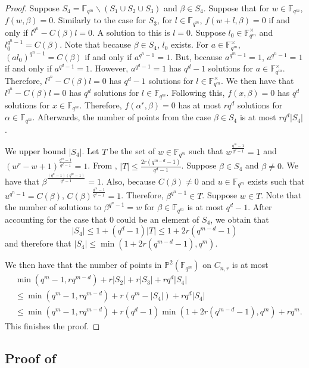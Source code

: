 \documentclass[12pt,letterpaper]{amsart}
\theoremstyle{definition}
\begin{document}
\begin{proof}
Suppose $S_4=\mathbb{F}_{q^m}\backslash (S_1\cup S_2\cup S_3)$ and $\beta\in S_4$. Suppose that for $w\in\mathbb{F}_{q^m}$, $f(w,\beta)=0$. Similarly to the case for $S_3$, for $l\in\mathbb{F}_{q^m}$, $f(w+l,\beta)=0$ if and only if $l^{q^n}-C(\beta)l=0$. A solution to this is $l=0$. Suppose $l_0\in\mathbb{F}_{q^m}^{\times}$ and $l_0^{q^n-1}=C(\beta)$. Note that because $\beta\in S_4$, $l_0$ exists. For $a\in\mathbb{F}_{q^m}^{\times}$, $(al_0)^{q^n-1}=C(\beta)$ if and only if $a^{q^n-1}=1$. But, because $a^{q^m-1}=1$, $a^{q^n-1}=1$ if and only if $a^{q^d-1}=1$. However, $a^{q^d-1}=1$ has $q^d-1$ solutions for $a\in\mathbb{F}_{q^m}^{\times}$. Therefore, $l^{q^n}-C(\beta)l=0$ has $q^d-1$ solutions for $l\in\mathbb{F}_{q^m}^{\times}$. We then have that $l^{q^n}-C(\beta)l=0$ has $q^d$ solutions for $l\in\mathbb{F}_{q^m}$. Following this, $f(x,\beta)=0$ has $q^d$ solutions for $x\in\mathbb{F}_{q^m}$. Therefore, $f(\alpha^r,\beta)=0$ has at most $rq^d$ solutions for $\alpha\in\mathbb{F}_{q^m}$. Afterwards, the number of points from the case $\beta\in S_4$ is at most $rq^d|S_4|$.

We upper bound $|S_4|$. Let $T$ be the set of $w\in\mathbb{F}_{q^m}$ such that $w^{\frac{q^m-1}{q^d-1}}=1$ and
$(w^r-w+1)^{\frac{q^m-1}{q^d-1}}=1$. From , $|T|\leq\frac{2r(q^{m-d}-1)}{q^d-1}$. Suppose $\beta\in S_4$ and $\beta\not=0$. We have that $\beta^{\frac{(q^n-1)(q^m-1)}{q^d-1}}=1$. Also, because $C(\beta)\not=0$ and $u\in\mathbb{F}_{q^m}$ exists such that $u^{q^n-1}=C(\beta)$, $C(\beta)^{\frac{q^m-1}{q^d-1}}=1$. Therefore, $\beta^{q^n-1}\in T$. Suppose $w\in T$. Note that the number of solutions to $\beta^{q^n-1}=w$ for $\beta\in\mathbb{F}_{q^m}$ is at most $q^d-1$. After accounting for the case that $0$ could be an element of $S_4$, we obtain that
\[
|S_4|\leq 1+(q^d-1)|T|\leq 1+2r(q^{m-d}-1)
\]
and therefore that $|S_4|\leq\min(1+2r(q^{m-d}-1), q^m)$.

We then have that the number of points in $\mathbb{P}^2(\mathbb{F}_{q^m})$ on $C_{n,r}$ is at most
\begin{align*}
    & \min(q^m-1, rq^{m-d})+r|S_2|+r|S_3|+rq^d|S_4|  \\ 
    & \leq \min(q^m-1, rq^{m-d}) +r(q^m-|S_4|)+rq^d|S_4| \\
    & \leq \min(q^m-1, rq^{m-d})+r(q^d-1)\min(1+2r(q^{m-d}-1), q^m)+rq^m.
\end{align*}
This finishes the proof.
\end{proof}

\subsection{Proof of 
\texorpdfstring{}{}}
\label{subsec:mainproof}
\end{document}
